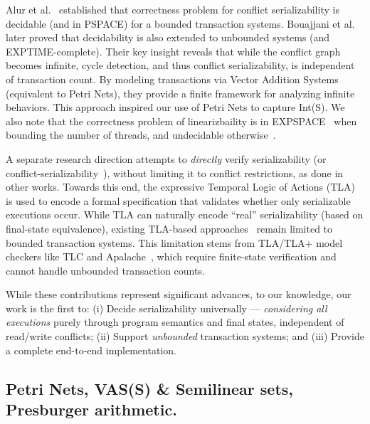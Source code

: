 %
Alur et al.~\cite{AlMcPe96} established that correctness problem for conflict serializability is decidable (and in PSPACE) for a bounded transaction systems. Bouajjani et al.~\cite{BoEmEnHa13} later proved that decidability is also extended to unbounded systems (and EXPTIME-complete). Their key insight reveals that while the conflict graph becomes infinite, cycle detection, and thus conflict serializability, is independent of transaction count. By modeling transactions via Vector Addition Systems (equivalent to Petri Nets), they provide a finite framework for analyzing infinite behaviors. This approach inspired our use of Petri Nets to capture Int(S).
%
We also note that the correctness problem of linearizbaility is in EXPSPACE~\cite{AlMcPe96} when bounding the number of threads, and undecidable otherwise~\cite{BoEmEnHa13}.  

A separate research direction attempts to \textit{directly} verify serializability (or conflict-serializability~\cite{CoOlPnTuZu07}), without limiting it to conflict restrictions, as done in other works. Towards this end, the expressive Temporal Logic of Actions (TLA)~\cite{La94} is used to encode a formal specification that validates whether only serializable executions occur. While TLA can naturally encode ``real'' serializability (based on final-state equivalence), existing TLA-based approaches~\cite{SoVaVi20, Ho24} remain limited to bounded transaction systems. This limitation stems from TLA/TLA+ model checkers like TLC and Apalache~\cite{YuMaLa99, KoKuTr19}, which require finite-state verification and cannot handle unbounded transaction counts.

%
While these contributions represent significant advances, to our knowledge, our work is the first to:
(i) Decide serializability universally --- \textit{considering all executions} purely through program semantics and final states, independent of read/write conflicts; 
(ii) Support \textit{unbounded} transaction systems; and
(iii) Provide a complete end-to-end implementation.

\subsection{Petri Nets, VAS(S) \& Semilinear sets, Presburger arithmetic.}
\label{sec:related:petri}


